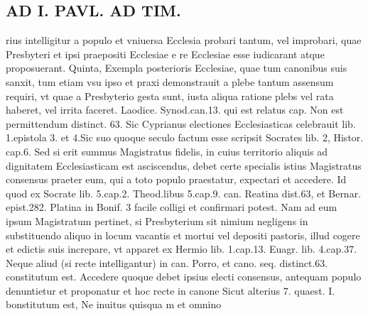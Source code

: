 \documentclass{article}
\begin{document}
\begin{pages}
\section*{AD I. PAVL. AD TIM. }
\marginpar{[ p.113 ]}\pstart rius intelligitur a populo et vniuersa Ecclesia probari tantum, vel improbari, quae Presbyteri et ipsi praepositi Ecclesiae e re Ecclesiae esse iudicarant atque proposuerant. Quinta, Exempla posterioris Ecclesiae, quae tum canonibus suis sanxit, tum etiam vsu ipso et praxi demonstrauit a plebe tantum assensum requiri, vt quae a Presbyterio gesta sunt, iusta aliqua ratione plebs vel rata haberet, vel irrita faceret. Laodice. Synod.can.13. qui est relatus cap. Non est permittendum distinct. 63. Sic Cyprianus electiones Ecclesiasticas celebrauit lib. 1.epistola 3. et 4.Sic suo quoque seculo factum esse scripsit Socrates lib. 2, Histor. cap.6. Sed si erit summus Magistratus fidelis, in cuius territorio aliquis ad dignitatem Ecclesiasticam est asciscendus, debet certe specialis istius Magistratus consensus praeter eum, qui a toto populo praestatur, expectari et accedere. Id quod ex Socrate lib. 5.cap.2. Theod.libus 5.cap.9. can. Reatina dist.63, et Bernar. epist.282. Platina in Bonif. 3 facile colligi et confirmari potest. Nam ad eum ipsum Magistratum pertinet, si Presbyterium sit nimium negligens in substituendo aliquo in locum vacantis et mortui vel depositi pastoris, illud cogere et edictis suis increpare, vt apparet ex Hermio lib. 1.cap.13. Euagr. lib. 4.cap.37. Neque aliud (si recte intelligantur) in can. Porro, et cano. seq. distinct.63. constitutum est. Accedere quoque debet ipsius electi consensus, antequam populo denuntietur et proponatur et hoc recte in canone Sicut alterius 7. quaest. I. bonstitutum est, Ne inuitus quisqua m et omnino  \pend

\end{pages}
\end{document}
